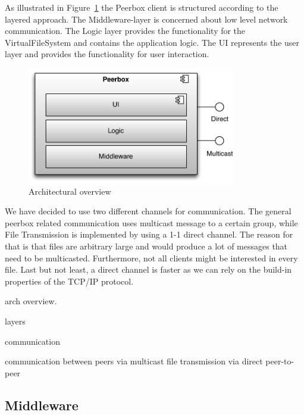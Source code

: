
As illustrated in Figure~\ref{fig:figures_archOverview} the Peerbox client is structured according to the layered approach. The Middleware-layer is concerned about low level network communication. The Logic layer provides the functionality for the VirtualFileSystem and contains the application logic. The UI represents the user layer and provides the functionality for user interaction.

\begin{figure}[htbp]
    \centering
        \includegraphics[height=2in]{figures/archOverview.pdf}
    \caption{Architectural overview}
    \label{fig:figures_archOverview}
\end{figure}

We have decided to use two different channels for communication. The general peerbox related communication uses multicast message to a certain group, while File Transmission is implemented by using a 1-1 direct channel. 
The reason for that is that files are arbitrary large and would produce a lot of messages that need to be multicasted. Furthermore, not all clients might be interested in every file. Last but not least, a direct channel is faster as we can rely on the build-in properties of the TCP/IP protocol. 




arch overview. 

layers

communication

communication between peers via multicast 
file transmission via direct peer-to-peer




\subsection{Middleware}

